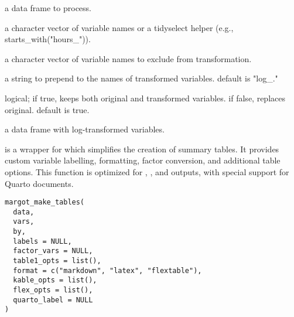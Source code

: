 \documentclass[a4paper]{book}
\begin{document}
\begin{Arguments}
\begin{ldescription}
\item[\code{data}] a data frame to process.

\item[\code{vars}] a character vector of variable names or a tidyselect helper (e.g., starts\_with("hours\_")).

\item[\code{exceptions}] a character vector of variable names to exclude from transformation.

\item[\code{prefix}] a string to prepend to the names of transformed variables. default is "log\_."

\item[\code{keep\_original}] logical; if true, keeps both original and transformed variables. if false, replaces original. default is true.
\end{ldescription}
\end{Arguments}
%
\begin{Value}
a data frame with log-transformed variables.
\end{Value}
%
\begin{Description}
 is a wrapper for  which simplifies the creation of summary tables.
It provides custom variable labelling, formatting, factor conversion, and additional table options.
This function is optimized for , , and  outputs, with special support for Quarto documents.
\end{Description}
%
\begin{Usage}
\begin{verbatim}
margot_make_tables(
  data,
  vars,
  by,
  labels = NULL,
  factor_vars = NULL,
  table1_opts = list(),
  format = c("markdown", "latex", "flextable"),
  kable_opts = list(),
  flex_opts = list(),
  quarto_label = NULL
)
\end{verbatim}
\end{Usage}
%
\end{document}
